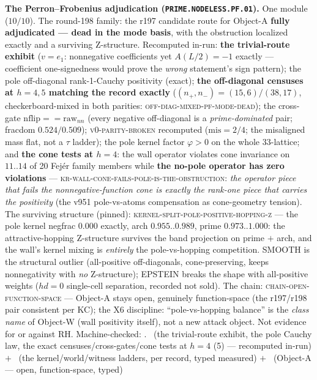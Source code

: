 \documentclass[11pt,a4paper]{article}
\theoremstyle{definition}
\begin{document}
\par\smallskip\noindent\textbf{The Perron--Frobenius adjudication
(\texttt{PRIME.\allowbreak NODELESS.\allowbreak PF.01}).}
One module ($10/10$).  The round-198 family: the r197 candidate
route for Object-A \textbf{fully adjudicated --- dead in the mode
basis}, with the obstruction localized exactly and a surviving
Z-structure.  Recomputed in-run: \textbf{the trivial-route
exhibit} ($v = e_1$: nonnegative coefficients yet $A(L/2) = -1$
exactly --- coefficient one-signedness would prove the
\emph{wrong} statement's sign pattern); the pole off-diagonal
rank-1-Cauchy positivity (exact); \textbf{the off-diagonal
censuses at $h = 4, 5$ matching the record exactly} ($(n_+, n_-)
= (15, 6)/(38, 17)$, checkerboard-mixed in both parities:
\textsc{off-diag-mixed-pf-mode-dead}); the cross-gate
$\mathrm{nflip} == \mathrm{raw}_{nn}$ (every negative
off-diagonal is a \emph{prime-dominated} pair; fracdom
$0.524/0.509$); \textsc{v0-parity-broken} recomputed ($\mathrm{mis}
= 2/4$; the misaligned mass flat, not a $\tau$ ladder); the pole
kernel factor $\varphi > 0$ on the whole 33-lattice; and
\textbf{the cone tests at $h = 4$}: the wall operator violates
cone invariance on $11..14$ of 20 Fej\'er family members while
\textbf{the no-pole operator has zero violations} ---
\textsc{kr-wall-cone-fails-pole-is-the-obstruction}: \emph{the
operator piece that fails the nonnegative-function cone is
exactly the rank-one piece that carries the positivity} (the v951
pole-vs-atoms compensation as cone-geometry tension).  The
surviving structure (pinned):
\textsc{kernel-split-pole-positive-hopping-z} --- the pole kernel
negfrac $0.000$ exactly, arch $0.955..0.989$, prime
$0.973..1.000$: the attractive-hopping Z-structure survives the
band projection on prime $+$ arch, and the wall's kernel mixing
is \emph{entirely} the pole-vs-hopping competition.  SMOOTH is
the structural outlier (all-positive off-diagonals,
cone-preserving, keeps nonnegativity with \emph{no} Z-structure);
EPSTEIN breaks the shape with all-positive weights ($hd = 0$
single-cell separation, recorded not sold).  The chain:
\textsc{chain-open-function-space} --- Object-A stays open,
genuinely function-space (the r197/r198 pair consistent per KC);
the X6 discipline: ``pole-vs-hopping balance'' is the \emph{class
name} of Object-W (wall positivity itself), not a new attack
object.  Not evidence for or against RH.
Machine-checked: .
\mE\ (the trivial-route exhibit, the pole Cauchy law, the exact
censuses/cross-gates/cone tests at $h = 4$ (5) --- recomputed
in-run) $+$ \mC\ (the kernel/world/witness ladders, per record,
typed measured) $+$ \mO\ (Object-A --- open, function-space,
typed)
\par\smallskip
\end{document}
